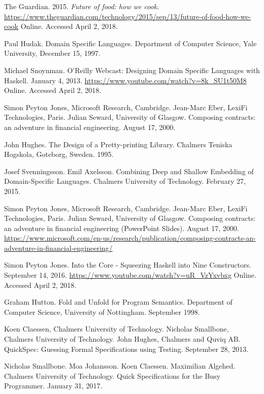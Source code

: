 \documentclass[11pt]{article}
\begin{document}
    \begin{thebibliography}{11}

        The Guardian. 2015. \textit{Future of food: how we cook}.
        \url{https://www.theguardian.com/technology/2015/sep/13/future-of-food-how-we-cook}
        Online. Accessed April 2, 2018.

        Paul Hudak. Domain Specific Languages. Department of Computer
        Science, Yale University, December 15, 1997.

        Michael Snoynman. O'Reilly Webcast: Designing Domain Specific
        Languages with Haskell. January 4, 2013.
        \url{https://www.youtube.com/watch?v=8k_SU1t50M8}
        Online. Accessed April 2, 2018.

        Simon Peyton Jones, Microsoft Research, Cambridge.
        Jean-Marc Eber, LexiFi Technologies, Paris. Julian Seward,
        University of Glasgow. Composing contracts: an adventure in
        financial engineering. August 17, 2000.

        John Hughes. The Design of a Pretty-printing Library.
        Chalmers Teniska Hogskola, Goteborg, Sweden. 1995.

        Josef Svenningsson. Emil Axelsson. Combining Deep and Shallow
        Embedding of Domain-Specific Languages. Chalmers University
        of Technology. February 27, 2015.

        Simon Peyton Jones, Microsoft Research, Cambridge.
        Jean-Marc Eber, LexiFi Technologies, Paris. Julian Seward,
        University of Glasgow. Composing contracts: an adventure in
        financial engineering (PowerPoint Slides). August 17, 2000.
        \url{https://www.microsoft.com/en-us/research/publication/composing-contracts-an-adventure-in-financial-engineering/}

        Simon Peyton Jones. Into the Core - Squeezing Haskell into
        Nine Constructors. September 14, 2016.
        \url{https://www.youtube.com/watch?v=uR_VzYxvbxg}
        Online. Accessed April 2, 2018.

        Graham Hutton. Fold and Unfold for Program Semantics. Department of
        Computer Science, University of Nottingham. September 1998.

        Koen Claessen, Chalmers University of Technology. Nicholas Smallbone,
        Chalmers University of Technology. John Hughes, Chalmers and Quviq AB.
        QuickSpec: Guessing Formal Specifications using Testing.
        September 28, 2013.

        Nicholas Smallbone. Moa Johansson. Koen Claessen. Maximilian Algehed.
        Chalmers University of Technology.
        Quick Specifications for the Busy Programmer. January 31, 2017.

    \end{thebibliography}   

    \newpage

    \appendix
\end{document}

